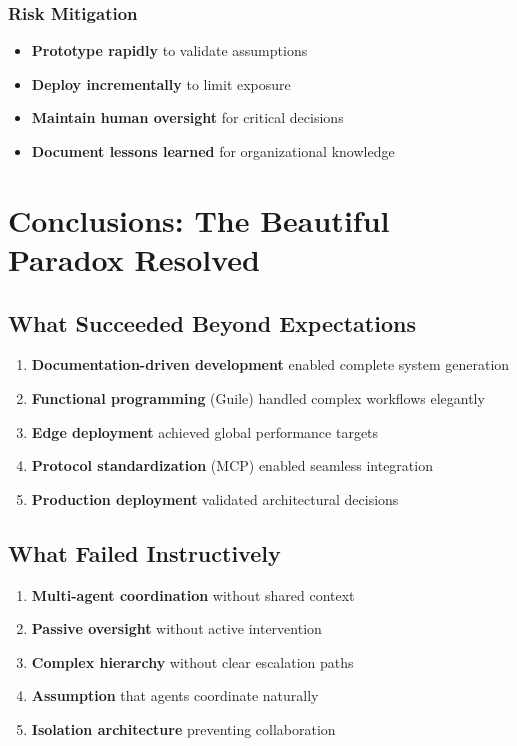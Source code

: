 \documentclass[11pt]{article}
\begin{document}
\subsubsection{Risk Mitigation}
\label{sec:orgf5817fa}
\begin{itemize}
\item \textbf{\textbf{Prototype rapidly}} to validate assumptions
\item \textbf{\textbf{Deploy incrementally}} to limit exposure
\item \textbf{\textbf{Maintain human oversight}} for critical decisions
\item \textbf{\textbf{Document lessons learned}} for organizational knowledge
\end{itemize}
\section{Conclusions: The Beautiful Paradox Resolved}
\label{sec:org23199b5}

\subsection{What Succeeded Beyond Expectations}
\label{sec:orgd54d03e}
\begin{enumerate}
\item \textbf{\textbf{Documentation-driven development}} enabled complete system generation
\item \textbf{\textbf{Functional programming}} (Guile) handled complex workflows elegantly
\item \textbf{\textbf{Edge deployment}} achieved global performance targets
\item \textbf{\textbf{Protocol standardization}} (MCP) enabled seamless integration
\item \textbf{\textbf{Production deployment}} validated architectural decisions
\end{enumerate}
\subsection{What Failed Instructively}
\label{sec:org6fd1735}
\begin{enumerate}
\item \textbf{\textbf{Multi-agent coordination}} without shared context
\item \textbf{\textbf{Passive oversight}} without active intervention
\item \textbf{\textbf{Complex hierarchy}} without clear escalation paths
\item \textbf{\textbf{Assumption}} that agents coordinate naturally
\item \textbf{\textbf{Isolation architecture}} preventing collaboration
\end{enumerate}
\end{document}
